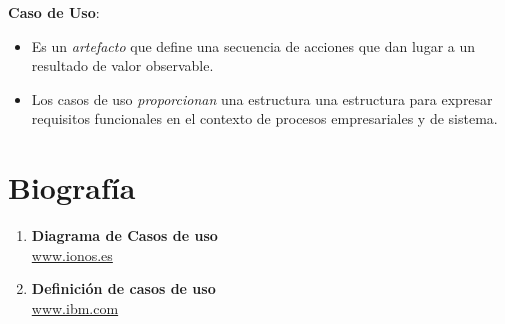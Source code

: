 \documentclass[12pt]{article}
\begin{document}
\textbf{Caso de Uso}:
\begin{itemize}
  \item  Es un \textit{artefacto} que define una secuencia de acciones que dan lugar a un resultado de valor observable.
  \item Los casos de uso \textit{proporcionan} una estructura una estructura para expresar requisitos funcionales en el contexto de procesos empresariales y de sistema.
\end{itemize}

\section{ Biografía }
\vspace{1cm}

\begin{enumerate}
  \item \textbf{Diagrama de Casos de uso}\\
    \href{https://www.ionos.es/digitalguide/paginas-web/desarrollo-web/diagrama-de-casos-de-uso/}{www.ionos.es}

  \item \textbf{Definición de casos de uso}\\
    \href{https://www.ibm.com/docs/es/elm/6.0.3?topic=requirements-defining-use-cases}{www.ibm.com}
\end{enumerate}
\end{document}
